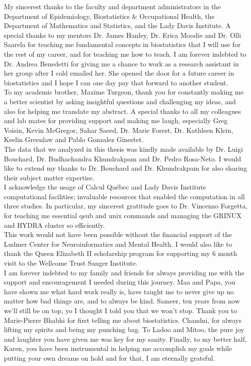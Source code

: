 \documentclass[12pt,letterpaper]{report}
\begin{document}
\begin{romanPagenumber}{2}
{My sincerest thanks to the faculty and department administrators in the Department of Epidemiology, Biostatistics \& Occupational Health, the Department of Mathematics and Statistics, and the Lady Davis Institute. A special thanks to my mentors Dr. James Hanley, Dr. Erica Moodie and Dr. Olli Saarela for teaching me fundamental concepts in biostatistics that I will use for the rest of my career, and for teaching me how to teach. I am forever indebted to Dr. Andrea Benedetti for giving me a chance to work as a research assistant in her group after I cold emailed her. She opened the door for a future career in biostatistics and I hope I can one day pay that forward to another student. \\
To my academic brother, Maxime Turgeon, thank you for constantly making me a better scientist by asking insightful questions and challenging my ideas, and also for helping me translate my abstract. 
A special thanks to all my colleagues and lab mates for providing support and making me laugh, especially Greg Voisin, Kevin McGregor, Sahar Saeed, Dr. Marie Forest, Dr. Kathleen Klein, Keelin Greenlaw and Pablo Gonzalez Ginestet.\\
The data that we analyzed in this thesis was kindly made available by Dr.
Luigi Bouchard, Dr. Budhachandra Khundrakpam and Dr. Pedro Rosa-Neto. I would like to extend my thanks to Dr. Bouchard and Dr. Khundrakpam for also sharing their subject matter expertise.\\
I acknowledge the usage of Calcul Qu\'{e}bec and Lady Davis Institute computational facilities; invaluable resources that enabled the computation in all three studies. In particular, my sincerest gratitude goes to Dr. Vincenzo Forgetta, for teaching me essential qsub and unix commands and managing the GRINUX and HYDRA cluster so efficiently.\\
This work would not have been possible without the financial support of the Ludmer Center for Neuroinformatics and Mental Health. I would also like to thank the Queen Elizabeth II scholarship program for supporting my 6 month visit to the Wellcome Trust Sanger Institute. \\
I am forever indebted to my family and friends for always providing me with the support and encouragement I needed during this journey. Maa and Papa, you have shown me what hard work really is, have taught me to never give up no matter how bad things are, and to always be kind. Sameer, ten years from now we'll still be on top, yo I thought I told you that we won't stop. Thank you to Marie-Pierre Bhabhi for first telling me about biostatistics. Chandni, for always lifting my spirits and being my punching bag. To Ladoo and Mitoo, the pure joy and laughter you have given me was key for my sanity. Finally, to my better half, Karen, you have been instrumental in helping me accomplish my goals while putting your own dreams on hold and for that, I am eternally grateful.   
}
	\Acknowledge	


\end{romanPagenumber}
\end{document}
